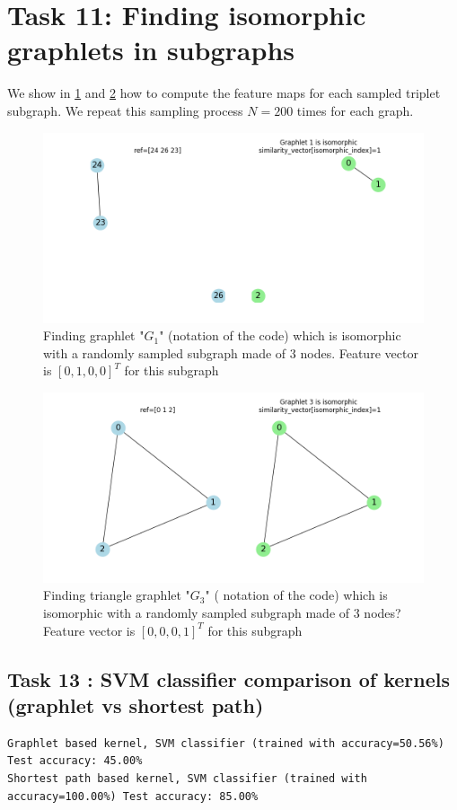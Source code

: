 \documentclass[a4paper]{article}
\begin{document}
\pagebreak
\section*{Task 11: Finding isomorphic graphlets in subgraphs}
We show in \ref{fig:finding_isomorphic_graphlets_subgraphs} and \ref{fig:finding_isomorphic_graphlets_subgraphs_triangle}
how to compute the feature maps for each sampled triplet subgraph.
We repeat this sampling process $N=200$ times for each graph.
\begin{figure}[ht]
    \centering
    \includegraphics[width=.6\textwidth]{figures/finding_isomorphic_graphlets_subgraphs.png}
    \caption{Finding graphlet "$G_1$" (notation of the code) which is isomorphic with a randomly sampled subgraph made of 3 nodes.
    Feature vector is $[0, 1, 0, 0]^T$ for this subgraph}
    \label{fig:finding_isomorphic_graphlets_subgraphs}
\end{figure}

\begin{figure}[ht]
    \centering
    \includegraphics[width=.6\textwidth]{figures/finding_isomorphic_graphlets_subgraphs_triangle.png}
    \caption{Finding triangle graphlet "$G_3$" ( notation of the code) which is isomorphic with a randomly sampled subgraph made of 3 nodes?
    Feature vector is $[0, 0, 0, 1]^T$ for this subgraph}
    \label{fig:finding_isomorphic_graphlets_subgraphs_triangle}
\end{figure}
\pagebreak

\subsection*{Task 13 : SVM classifier comparison of kernels (graphlet vs shortest path)}
\begin{verbatim}
Graphlet based kernel, SVM classifier (trained with accuracy=50.56%) Test accuracy: 45.00%
Shortest path based kernel, SVM classifier (trained with accuracy=100.00%) Test accuracy: 85.00%
\end{verbatim}
\end{document}
